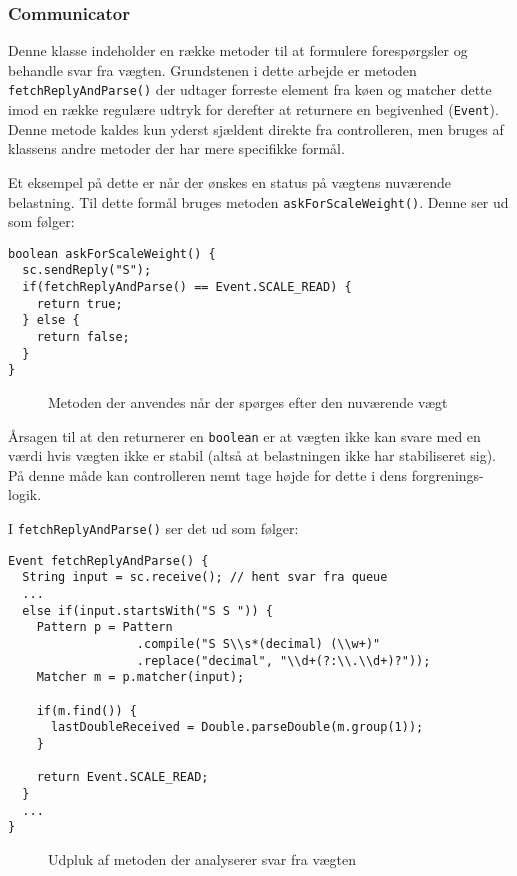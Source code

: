 \documentclass[a4paper]{article}
\begin{document}

\subsubsection{Communicator} %

Denne klasse indeholder en række metoder til at formulere forespørgsler og behandle svar fra vægten. Grundstenen i dette arbejde er metoden \texttt{fetchReplyAndParse()} der udtager forreste element fra køen og matcher dette imod en række regulære udtryk for derefter at returnere en begivenhed (\texttt{Event}). Denne metode kaldes kun yderst sjældent direkte fra controlleren, men bruges af klassens andre metoder der har mere specifikke formål.

Et eksempel på dette er når der ønskes en status på vægtens nuværende belastning. Til dette formål bruges metoden \texttt{askForScaleWeight()}. Denne ser ud som følger:

\begin{lstlisting}
boolean askForScaleWeight() {
  sc.sendReply("S");
  if(fetchReplyAndParse() == Event.SCALE_READ) {
    return true;
  } else {
    return false;
  }
}
\end{lstlisting}
\begin{figure}[h!]
  \caption{Metoden der anvendes når der spørges efter den nuværende vægt}
\end{figure}


Årsagen til at den returnerer en \texttt{boolean} er at vægten ikke kan svare med en værdi hvis vægten ikke er stabil (altså at belastningen ikke har stabiliseret sig). På denne måde kan controlleren nemt tage højde for dette i dens forgrenings-logik.

I \texttt{fetchReplyAndParse()} ser det ud som følger:

\begin{lstlisting}
Event fetchReplyAndParse() {
  String input = sc.receive(); // hent svar fra queue
  ...
  else if(input.startsWith("S S ")) {
    Pattern p = Pattern
                  .compile("S S\\s*(decimal) (\\w+)"
                  .replace("decimal", "\\d+(?:\\.\\d+)?"));
    Matcher m = p.matcher(input);

    if(m.find()) {
      lastDoubleReceived = Double.parseDouble(m.group(1));
    }

    return Event.SCALE_READ;
  }
  ...
}
\end{lstlisting}
\begin{figure}[h!]
  \caption{Udpluk af metoden der analyserer svar fra vægten}
\end{figure}
\end{document}
